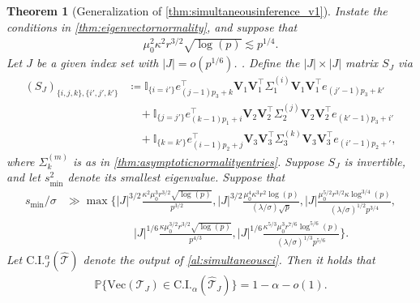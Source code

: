 \documentclass[10pt]{article}
\newcommand{\0}{{\mathbf{0}}}
\newcommand{\1}{{\mathbf{1}}}
\renewcommand{\t}{^{\top}}
\newtheorem{theorem}{Theorem}
\newcommand{\p}{\mathbb{P}}
\renewcommand{\hat}{\widehat}
\renewcommand{\hat}{\widehat}
\begin{document}
\begin{theorem}[Generalization of \cref{thm:simultaneousinference_v1}] \label{thm:simultaneousinference}
Instate the conditions in \cref{thm:eigenvectornormality}, and suppose that
\begin{align*}
    \mu_0^2 \kappa^2 r^{3/2} \sqrt{\log(p)} \lesssim p^{1/4}.
\end{align*}
Let $J$ be a given index set with $|J| = o(p^{1/6})$. .  Define the $|J|\times |J|$ matrix $S_J$ via
\begin{align*}
    (S_J)_{\{i,j,k\},\{i',j',k'\}} &\coloneqq  \mathbb{I}_{\{i= i'\}} e_{(j-1)p_3 + k}\t  \mathbf{V}_1 \mathbf{V}_1\t \Sigma_1^{(i)} \mathbf{ V}_1 \mathbf{ V}_1\t e_{(j'-1)p_3 + k'} \\
    &\quad + \mathbb{I}_{\{j= j'\}} e_{(k-1)p_1 + i}\t  \mathbf{ V}_2 \mathbf{ V}_2\t \Sigma_2^{(j)} \mathbf{ V}_2 \mathbf{ V}_2\t e_{(k'-1)p_3 + i'}  \\
    &\quad + \mathbb{I}_{\{k= k'\}} e_{(i-1)p_2 + j}\t  \mathbf{ V}_3 \mathbf{ V}_3\t \Sigma_3^{(k)} \mathbf{ V}_3 \mathbf{ V}_3\t e_{(i'-1)p_2 + '},
\end{align*}
where $\Sigma_k^{(m)}$ is as in \cref{thm:asymptoticnormalityentries}.  Suppose $S_J$ is invertible, and let $s^2_{\min}$ denote its smallest eigenvalue.  Suppose that 
\begin{align*}
    s_{\min}/\sigma &\gg \max\bigg\{ |J|^{3/2}  \frac{\kappa^2 \mu_0^3 r^{3/2} \sqrt{\log(p)}}{p^{3/2}}, |J|^{3/2} \frac{ \mu_0^4 \kappa^3 r^2 \log(p)}{(\lambda/\sigma) \sqrt{p}}, |J| \frac{ \mu_0^{5/2} r^{3/2} \kappa \log^{3/4}(p)}{(\lambda/\sigma)^{1/2} p^{3/4}}, \\
      &\qquad \qquad \qquad  |J|^{1/6} \frac{\kappa \mu_0^{3/2} r^{3/2} \sqrt{\log(p)}}{p^{4/3}}, |J|^{1/6} \frac{\kappa^{5/3}\mu_0^{3} r^{7/6} \log^{5/6}(p)}{(\lambda/\sigma)^{1/3} p^{5/6}}\bigg\}.
\end{align*}
Let $\mathrm{C.I.}_J^{\alpha}(\mathcal{\hat T})$ denote the output of \cref{al:simultaneousci}.
 Then it holds that
\begin{align*}
 \p\bigg\{ \mathrm{Vec}(\mathcal{ T}_J) \in \mathrm{C.I.}_{\alpha}(\mathcal{\hat T}_J) \bigg\}= 1- \alpha -  o(1).
\end{align*}
\end{theorem}
\end{document}
